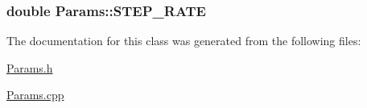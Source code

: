 \subsubsection[{S\+T\+E\+P\+\_\+\+R\+A\+T\+E}]{\setlength{\rightskip}{0pt plus 5cm}double Params\+::\+S\+T\+E\+P\+\_\+\+R\+A\+T\+E}\label{class_params_a5631d479c6912c8992ccfe38ea6b4d2a}


The documentation for this class was generated from the following files\+:\begin{DoxyCompactItemize}
\item 
\hyperlink{_params_8h}{Params.\+h}\item 
\hyperlink{_params_8cpp}{Params.\+cpp}\end{DoxyCompactItemize}
